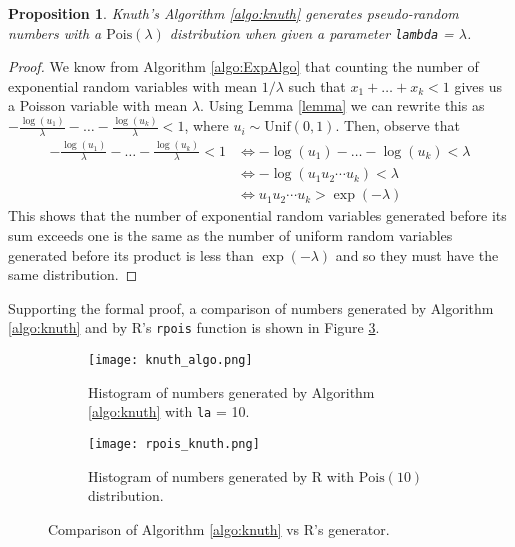 \documentclass[letterpaper, 10 pt, conference]{article}
\renewcommand{\iff}{\ensuremath{\Leftrightarrow}} %
\newtheorem{prop}{Proposition}
\begin{document}
\begin{prop}
Knuth's Algorithm \ref{algo:knuth} generates pseudo-random numbers with a $\mathrm{Pois}(\lambda)$ distribution when given a parameter \texttt{lambda} = $\lambda$.
\end{prop}
\begin{proof}
We know from Algorithm \ref{algo:ExpAlgo} that counting the number of exponential random variables with mean $1/\lambda$ such that $x_1 + \dots + x_k < 1$ gives us a Poisson variable with mean $\lambda$.
Using Lemma \ref{lemma} we can rewrite this as $-\frac{\log(u_1)}{\lambda} - \dots - \frac{\log(u_k)}{\lambda} < 1$, where $u_i \sim \mathrm{Unif}(0,1)$. Then, observe that
\begin{align}
-\frac{\log(u_1)}{\lambda} - \dots - \frac{\log(u_k)}{\lambda} < 1 &\iff -\log(u_1) - \dots - \log(u_k) < \lambda \\
&\iff -\log(u_1 u_2 \cdots u_k) < \lambda \\
&\iff u_1 u_2 \cdots u_k > \exp(-\lambda)
\end{align}
This shows that the number of exponential random variables generated before its sum exceeds one is the same as the number of uniform random variables generated before its product is less than $\exp(-\lambda)$ and so they must have the same distribution.
\end{proof}

Supporting the formal proof, a comparison of numbers generated by Algorithm \ref{algo:knuth} and by R's \texttt{rpois} function is shown in Figure \ref{fig:algorithm2}.

 \begin{figure}
	\centering
	\begin{subfigure}[b]{0.45\linewidth}
		\texttt{[image: knuth\_algo.png]}
		\caption{Histogram of numbers generated by Algorithm \ref{algo:knuth} with \texttt{la} = 10.}
		\label{fig:knuth_algo}
	\end{subfigure}
	\hfill
	\begin{subfigure}[b]{0.45\linewidth}
		\texttt{[image: rpois\_knuth.png]}
		\caption{Histogram of numbers generated by R with $\mathrm{Pois}(10)$ distribution.}
		\label{fig:rpois_knuth}
	\end{subfigure}
	\caption{Comparison of Algorithm \ref{algo:knuth} vs R's generator.} 
	\label{fig:algorithm2}
\end{figure}
\end{document}

